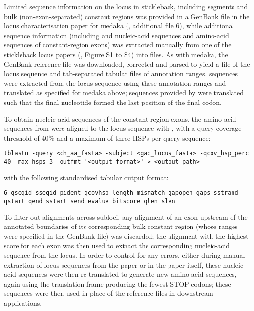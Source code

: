 \noindent Limited sequence information on the \igh{} locus in stickleback, including \vh segments and bulk (non-exon-separated) constant regions was provided in a GenBank file in the locus characterisation paper for medaka (\parencite{magadan2011medaka}, additional file 6), while additional sequence information (including \dh and \jh nucleic-acid sequences and amino-acid sequences of constant-region exons) was extracted manually from one of the stickleback locus papers (\parencite{bao2010stickleback},  Figure S1 to S4) into  files. As with medaka, the GenBank reference file was downloaded, corrected and parsed to yield a  file of the locus sequence and tab-separated tabular files of annotation ranges. \vh sequences were extracted from the locus sequence using these annotation ranges and translated as specified for medaka above; \jh sequences provided by \parencite{bao2010stickleback} were translated such that the final nucleotide formed the last position of the final codon.

To obtain nucleic-acid sequences of the constant-region exons, the amino-acid sequences from \parencite{bao2010stickleback} were aligned to the locus sequence with  \parencite{gertz2006tblastn}, with a query coverage threshold of 40\% and a maximum of three HSPs per query sequence:

\begin{lstlisting}
tblastn -query <ch_aa_fasta> -subject <gac_locus_fasta> -qcov_hsp_perc 40 -max_hsps 3 -outfmt '<output_format>' > <output_path>
\end{lstlisting}

\noindent with the following standardised tabular output format: 

\begin{lstlisting}
6 qseqid sseqid pident qcovhsp length mismatch gapopen gaps sstrand qstart qend sstart send evalue bitscore qlen slen
\end{lstlisting}

\noindent To filter out alignments across subloci, any alignment of an exon upstream of the annotated boundaries of its corresponding bulk constant region (whose ranges were specified in the GenBank file) was discarded; the alignment with the highest score for each exon was then used to extract the corresponding nucleic-acid sequence from the locus. In order to control for any errors, either during manual extraction of locus sequences from the paper or in the paper itself, these nucleic-acid sequences were then re-translated to generate new amino-acid sequences, again using the translation frame producing the fewest STOP codons; these sequences were then used in place of the reference files in downstream applications.

